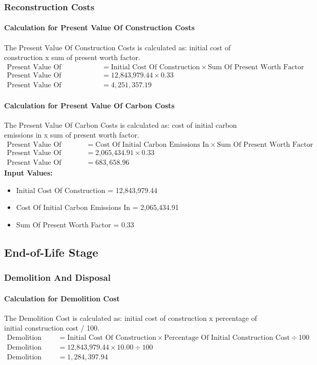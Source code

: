 \documentclass{article}
\begin{document}
\subsubsection{Reconstruction Costs}
 \paragraph{Calculation for Present Value Of Construction Costs} 
The Present Value Of Construction Costs is calculated as: initial cost of construction x sum of present worth factor.
\begin{align*}
 \text{Present Value Of Construction Costs} &= \text{Initial Cost Of Construction} \times \text{Sum Of Present Worth Factor} \\
 \text{Present Value Of Construction Costs} &= \text{12,843,979.44} \times 0.33 \\
 \text{Present Value Of Construction Costs} &= 4,251,357.19 
\end{align*}
 \paragraph{Calculation for Present Value Of Carbon Costs} 
The Present Value Of Carbon Costs is calculated as: cost of initial carbon emissions in x sum of present worth factor.
\begin{align*}
 \text{Present Value Of Carbon Costs} &= \text{Cost Of Initial Carbon Emissions In} \times \text{Sum Of Present Worth Factor} \\
 \text{Present Value Of Carbon Costs} &= \text{2,065,434.91} \times 0.33 \\
 \text{Present Value Of Carbon Costs} &= 683,658.96 
\end{align*}
\textbf{Input Values:}
\begin{itemize}
\item Initial Cost Of Construction = 12,843,979.44
\item Cost Of Initial Carbon Emissions In = 2,065,434.91
\item Sum Of Present Worth Factor = 0.33
\end{itemize}
\subsection{End-of-Life Stage}
\subsubsection{Demolition And Disposal}
 \paragraph{Calculation for Demolition Cost} 
The Demolition Cost is calculated as: initial cost of construction x percentage of initial construction cost / 100.
\begin{align*}
 \text{Demolition Cost} &= \text{Initial Cost Of Construction} \times \text{Percentage Of Initial Construction Cost} \div 100 \\
 \text{Demolition Cost} &= \text{12,843,979.44} \times 10.00 \div 100 \\
 \text{Demolition Cost} &= 1,284,397.94 
\end{align*}
\end{document}
